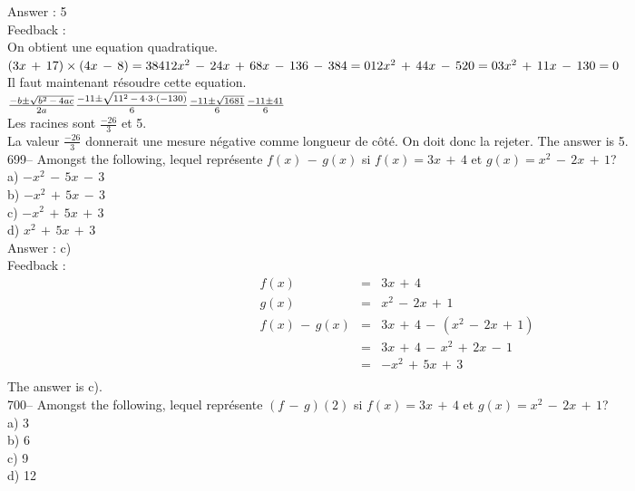 \documentclass[letterpaper, 12pt]{article}
\begin{document}
Answer : 5\\

Feedback : \\
On obtient une equation quadratique.  \\
$(3x\,+\,17)\times(4x\,-\,8)=384\\
12x^{2}\,-\,24x\,+\,68x\,-\,136\,-\,384=0\\
12x^{2}\,+\,44x\,-\,520=0\\
3x^{2}\,+\,11x\,-\,130=0$\\
Il faut maintenant r\'esoudre cette equation.\\[2mm]
$\frac{-b\pm\sqrt{b^{2}\,-\,4ac}}{2a}\\[2mm]
\frac{-11\pm \sqrt{11^{2}\,-\,4\cdot3\cdot(-130)}}{6}\\[2mm]
\frac{-11\pm \sqrt{1681}}{6}\\[2mm]
\frac{-11\pm 41}{6}$\\[2mm]
Les racines sont $\frac{-26}{3}$ et 5.\\[2mm]
La valeur $\frac{-26}{3}$ donnerait une mesure n\'egative comme longueur de
c\^ot\'e. On doit donc la rejeter.  The answer is 5.\\

699-- Amongst the following, lequel repr\'esente $f(x)\,-\,g(x)$
si $f(x)=3x\,+\,4$ et $g(x)=x^{2}\,-\,2x\,+\,1$?\\
a) $-x^{2}\,-\,5x\,-\,3$\\
b) $-x^{2}\,+\,5x\,-\,3$\\
c) $-x^{2}\,+\,5x\,+\,3$\\
d) $x^{2}\,+\,5x\,+\,3$\\

Answer : c)\\

Feedback : \\
\begin{eqnarray*}
f(x)&=&3x\,+\,4\\
g(x)&=&x^{2}\,-\,2x\,+\,1\\
f(x)\,-\,g(x)&=&3x\,+\,4\,-\,(x^{2}\,-\,2x\,+\,1)\\
&=&3x\,+\,4\,-\,x^{2}\,+\,2x\,-\,1\\
&=&-x^{2}\,+\,5x\,+\,3\\
\end{eqnarray*}
The answer is c).\\

700-- Amongst the following, lequel repr\'esente $(f\,-\,g)(2)$
si $f(x)=3x\,+\,4$ et $g(x)=x^{2}\,-\,2x\,+\,1$?\\
a) 3\\
b) 6\\
c) 9\\
d) 12\\
\end{document}

